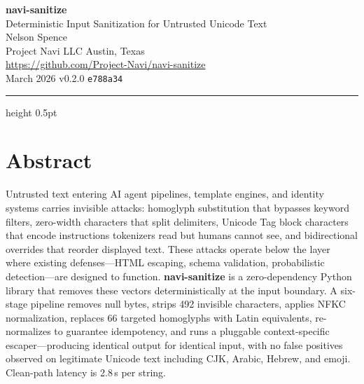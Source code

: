 \documentclass[11pt,letterpaper]{article}
\begin{document}

\begin{center}
  {\LARGE\bfseries\color{NaviBlue} navi-sanitize}\\[0.4em]
  {\large Deterministic Input Sanitization for Untrusted Unicode Text}\\[1.5em]
  {\normalsize Nelson Spence}\\[0.2em]
  {\small\color{NaviGray} Project Navi LLC \quad\textbullet\quad Austin, Texas}\\[0.2em]
  {\small\color{NaviGray} \url{https://github.com/Project-Navi/navi-sanitize}}\\[1.5em]
  {\small March 2026 \quad\textbullet\quad v0.2.0 \quad\textbullet\quad \texttt{e788a34}}
\end{center}

\vspace{0.5em}
\hrule height 0.5pt
\vspace{1.5em}
\thispagestyle{empty}


\section*{Abstract}

Untrusted text entering AI agent pipelines, template engines, and identity systems carries invisible attacks: homoglyph substitution that bypasses keyword filters, zero-width characters that split delimiters, Unicode Tag block characters that encode instructions tokenizers read but humans cannot see, and bidirectional overrides that reorder displayed text. These attacks operate below the layer where existing defenses---HTML escaping, schema validation, probabilistic detection---are designed to function. \textbf{navi-sanitize} is a zero-dependency Python library that removes these vectors deterministically at the input boundary. A six-stage pipeline removes null bytes, strips 492 invisible characters, applies NFKC normalization, replaces 66 targeted homoglyphs with Latin equivalents, re-normalizes to guarantee idempotency, and runs a pluggable context-specific escaper---producing identical output for identical input, with no false positives observed on legitimate Unicode text including CJK, Arabic, Hebrew, and emoji. Clean-path latency is 2.8\,\textmu s per string.
\end{document}
